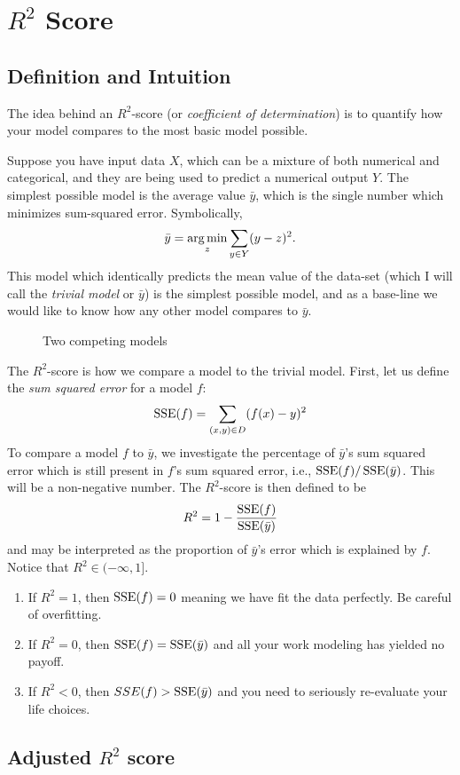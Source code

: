 \section{$R^2$ Score}
\label{sec:bipartide-expanders}

\subsection{Definition and Intuition}
The idea behind an $R^2$-score (or \emph{coefficient of determination}) is to quantify how your model compares to the most basic model possible.

Suppose you have input data $X$, which can be a mixture of both numerical and categorical, and they are being used to predict a numerical output $Y$. The simplest possible model is the average value $\bar y$, which is the single number which minimizes sum-squared error. Symbolically,
\begin{equation}
  \label{eq:mean-sse}
  \bar y = \operatorname*{arg\,min}_{z} \sum_{y \in Y} (y - z)^2.
\end{equation}
This model which identically predicts the mean value of the data-set (which I will call the \emph{trivial model} or $\bar y$) is the simplest possible model, and as a base-line we would like to know how any other model compares to $\bar y$.
\begin{figure}[h]
  \centering
  \caption{Two competing models}
  \label{fig:r2}
\end{figure}

The $R^2$-score is how we compare a model to the trivial model. First, let us define the \emph{sum squared error} for a model $f$:
\begin{equation}
  \label{eq:SSE}
  \operatorname{SSE}(f) = \sum_{(x,y) \in D} (f(x) - y)^2
\end{equation}
To compare a model $f$ to $\bar y$, we investigate the percentage of $\bar y$'s sum squared error which is still present in $f$'s sum squared error, i.e., $\operatorname{SSE}(f) / \operatorname{SSE}(\bar y)$. This will be a non-negative number. The $R^2$-score is then defined to be
\begin{equation}
  \label{eq:R2}
  R^2 = 1 - \frac{\operatorname{SSE}(f)}{\operatorname{SSE}(\bar y)}
\end{equation}
and may be interpreted as the proportion of $\bar y$'s error which is explained by $f$. Notice that $R^2 \in (-\infty,1]$.
\begin{enumerate}
\item If $R^2 = 1$, then $\operatorname{SSE}(f)= 0$ meaning we have fit the data perfectly. Be careful of overfitting.
\item If $R^2 = 0$, then $\operatorname{SSE}(f) = \operatorname{SSE}(\bar y)$ and all your work modeling has yielded no payoff.
\item If $R^2 < 0$, then $SSE(f) > \operatorname{SSE}(\bar y)$ and you need to seriously re-evaluate your life choices.
\end{enumerate}

\subsection{Adjusted $R^2$ score}



